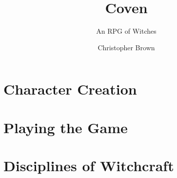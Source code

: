 \documentclass[a4paper,10pt,twocolumn]{book}
\title{Coven}
\subtitle{An RPG of Witches}
\author{Christopher Brown}
\date{}
\begin{document}
\maketitle



\setcounter{tocdepth}{1} %
\tableofcontents



\part{Character Creation}









\part{Playing the Game}



\part{Disciplines of Witchcraft}






















\end{document}
